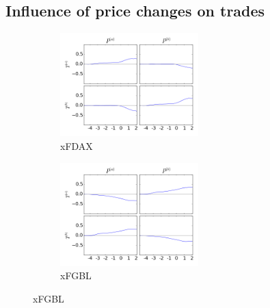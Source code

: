 \documentclass[a4paper,11pt]{article}
\begin{document}
\subsection{Influence of price changes on trades}
\label{PT}
\begin{figure}[H]
        \begin{subfigure}[b]{0.45\textwidth}
                \includegraphics[width=\textwidth,height=40mm]{xFDAXPA_PB_TA_TB_LA_LB_CA_CB__PAPB-_TATBcausality.png}
                \caption{xFDAX}
        \end{subfigure}
        \begin{subfigure}[b]{0.45\textwidth}
                \includegraphics[width=\textwidth,height=40mm]{xFGBLPA_PB_TA_TB_LA_LB_CA_CB__PAPB-_TATBcausality.png}
                \caption{xFGBL}
        \end{subfigure}
\end{figure}
\end{document}
